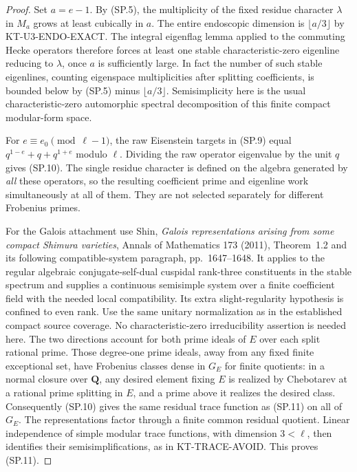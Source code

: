 \begin{proof}
Set $a=e-1$. By (SP.5), the multiplicity of the fixed
residue character $\lambda$ in $M_a$ grows at least
cubically in $a$. The entire endoscopic dimension is
$\lfloor a/3\rfloor$ by KT-U3-ENDO-EXACT. The integral
eigenflag lemma applied to the commuting Hecke operators
therefore forces at least one stable characteristic-zero
eigenline reducing to $\lambda$, once $a$ is sufficiently
large. In fact the number of such stable eigenlines,
counting eigenspace multiplicities after splitting
coefficients, is bounded below by (SP.5) minus
$\lfloor a/3\rfloor$. Semisimplicity here is the usual
characteristic-zero automorphic spectral decomposition
of this finite compact modular-form space.

For $e\equiv e_0\pmod{\ell-1}$, the raw Eisenstein targets
in (SP.9) equal $q^{1-e}+q+q^{1+e}$ modulo $\ell$.
Dividing the raw operator eigenvalue by the unit $q$
gives (SP.10). The single residue character is defined
on the algebra generated by \emph{all} these operators,
so the resulting coefficient prime and eigenline work
simultaneously at all of them. They are not selected
separately for different Frobenius primes.

For the Galois attachment use Shin, \emph{Galois representations
arising from some compact Shimura varieties}, Annals of
Mathematics 173 (2011), Theorem~1.2 and its following
compatible-system paragraph, pp.~1647--1648. It applies to
the regular algebraic conjugate-self-dual cuspidal
rank-three constituents in the stable spectrum and supplies
a continuous semisimple system over a finite coefficient
field with the needed local compatibility. Its extra
slight-regularity hypothesis is confined to even rank.
Use the same unitary normalization as in the established
compact source coverage. No characteristic-zero
irreducibility assertion is needed here. The two
directions account for both prime ideals of $E$ over
each split rational prime. Those degree-one prime ideals,
away from any fixed finite exceptional set, have Frobenius
classes dense in $G_E$ for finite quotients: in a normal
closure over $\mathbf Q$, any desired element fixing $E$
is realized by Chebotarev at a rational prime splitting
in $E$, and a prime above it realizes the desired class.
Consequently (SP.10) gives the same residual trace function
as (SP.11) on all of $G_E$. The representations factor
through a finite common residual quotient. Linear
independence of simple modular trace functions, with
dimension $3<\ell$, then identifies their semisimplifications,
as in KT-TRACE-AVOID. This proves (SP.11).
\end{proof}

